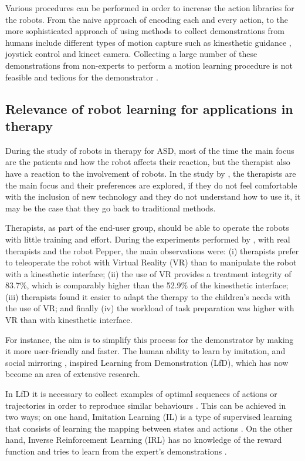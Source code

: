 \documentclass[thesis]{mas_proposal}
\begin{document}
    Various procedures can be performed in order to increase the action libraries for the robots. From the naive approach of encoding each and every action, to the more sophisticated approach of using methods to collect demonstrations from humans include different types of motion capture such as kinesthetic guidance \cite{Kronander2013}, joystick control \cite{Jiang2013} and kinect camera\cite{Assad2020}. Collecting a large number of these demonstrations from non-experts to perform a motion learning procedure is not feasible and tedious for the demonstrator \cite{Chen2022}.
    
	\subsection{Relevance of robot learning for applications in therapy}
    
    During the study of robots in therapy for ASD, most of the time the main focus are the patients and how the robot affects their reaction, but the therapist also have a reaction to the involvement of robots. In the study by \cite{Kulikovskiy2021}, the therapists are the main focus and their preferences are explored, if they do not feel comfortable with the inclusion of new technology and they do not understand how to use it, it may be the case that they go back to traditional methods.
    
    Therapists, as part of the end-user group, should be able to operate the robots with little training and effort. During the experiments performed by \cite{Kulikovskiy2021}, with real therapists and the robot Pepper, the main observations were: (i) therapists prefer to teleoperate the robot with Virtual Reality (VR) than to manipulate the robot with a kinesthetic interface; (ii) the use of VR provides a treatment integrity of 83.7\%, which is comparably higher than the 52.9\% of the kinesthetic interface; (iii) therapists found it easier to adapt the therapy to the children's needs with the use of VR; and finally (iv) the workload of task preparation was higher with VR than with kinesthetic interface. 
       
    For instance, the aim is to simplify this process for the demonstrator by making it more user-friendly and faster. The human ability to learn by imitation, and social mirroring \cite{Byrne2005}, inspired Learning from Demonstration (LfD), which has now become an area of extensive research.
    
    In LfD it is necessary to collect examples of optimal sequences of actions or trajectories in order to reproduce similar behaviours \cite{Piot2017}. This can be achieved in two ways; on one hand, Imitation Learning (IL) is a type of supervised learning that consists of learning the mapping between states and actions \cite{Dinyari2020}. On the other hand, Inverse Reinforcement Learning (IRL) has no knowledge of the reward function and tries to learn from the expert's demonstrations \cite{Reddy2019}.
    
\end{document}
